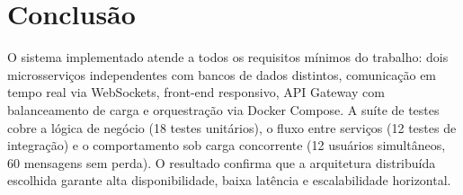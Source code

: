 \documentclass[12pt,a4paper]{article}
\begin{document}
\section{Conclusão}

O sistema implementado atende a todos os requisitos mínimos do trabalho: dois microsserviços independentes com bancos de dados distintos, comunicação em tempo real via WebSockets, front-end responsivo, API Gateway com balanceamento de carga e orquestração via Docker Compose. A suíte de testes cobre a lógica de negócio (18 testes unitários), o fluxo entre serviços (12 testes de integração) e o comportamento sob carga concorrente (12 usuários simultâneos, 60 mensagens sem perda). O resultado confirma que a arquitetura distribuída escolhida garante alta disponibilidade, baixa latência e escalabilidade horizontal.
\end{document}
